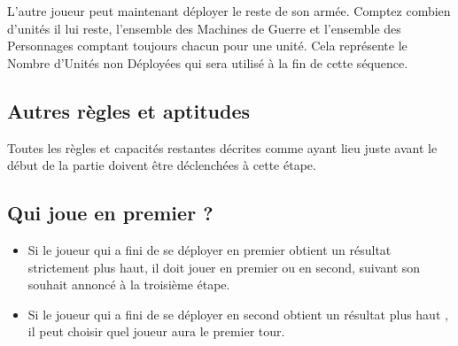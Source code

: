 L'autre joueur peut maintenant déployer le reste de son armée. Comptez combien d'unités il lui reste, l'ensemble des Machines de Guerre et l'ensemble des Personnages comptant toujours chacun pour une unité. Cela représente le \og Nombre d'Unités non Déployées \fg{} qui sera utilisé à la fin de cette séquence.

\subsection{Autres règles et aptitudes}

Toutes les règles et capacités restantes décrites comme ayant lieu juste avant le début de la partie doivent être déclenchées à cette étape.

\newpage
\subsection{Qui joue en premier ?}

\begin{itemize}[label={-}]
\item Si le joueur qui a fini de se déployer en premier obtient un résultat strictement plus haut, il doit jouer en premier ou en second, suivant son souhait annoncé à la troisième étape.
\item Si le joueur qui a fini de se déployer en second obtient un résultat plus haut , il peut choisir quel joueur aura le premier tour.
\end{itemize}

